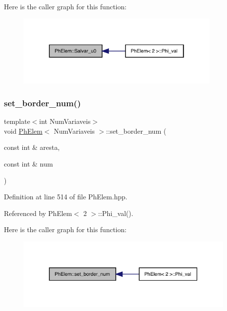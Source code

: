 Here is the caller graph for this function\+:
\nopagebreak
\begin{figure}[H]
\begin{center}
\leavevmode
\includegraphics[width=286pt]{classPhElem_ab6765ea1fa41b3a2d565d86872d6e7e6_icgraph}
\end{center}
\end{figure}
\mbox{\label{classPhElem_a05b05802884ecd42ed42e46108a0d5b1}} 
\subsubsection{\texorpdfstring{set\+\_\+border\+\_\+num()}{set\_border\_num()}}
{\footnotesize\ttfamily template$<$int Num\+Variaveis$>$ \\
void \hyperlink{classPhElem}{Ph\+Elem}$<$ Num\+Variaveis $>$\+::set\+\_\+border\+\_\+num (\begin{DoxyParamCaption}\item[{const int \&}]{aresta,  }\item[{const int \&}]{num }\end{DoxyParamCaption})}



Definition at line 514 of file Ph\+Elem.\+hpp.



Referenced by Ph\+Elem$<$ 2 $>$\+::\+Phi\+\_\+val().

Here is the caller graph for this function\+:
\nopagebreak
\begin{figure}[H]
\begin{center}
\leavevmode
\includegraphics[width=307pt]{classPhElem_a05b05802884ecd42ed42e46108a0d5b1_icgraph}
\end{center}
\end{figure}
\mbox{\label{classPhElem_aafd112d676dc3e16309e8ec8980f1c97}} 

